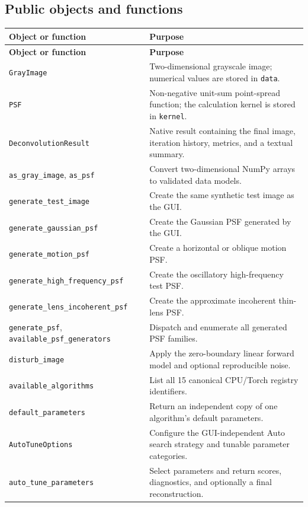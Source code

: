 \documentclass[10pt,a4paper]{article}
\newcommand{\code}[1]{\texttt{#1}}
\begin{document}
\subsection{Public objects and functions}
\begin{longtable}{>{\raggedright\arraybackslash}p{}>{\raggedright\arraybackslash}p{}}
\toprule\textbf{Object or function}&\textbf{Purpose}\\\midrule\endfirsthead
\toprule\textbf{Object or function}&\textbf{Purpose}\\\midrule\endhead
\code{GrayImage}&Two-dimensional grayscale image; numerical values are stored in \code{data}.\\
\code{PSF}&Non-negative unit-sum point-spread function; the calculation kernel is stored in \code{kernel}.\\
\code{DeconvolutionResult}&Native result containing the final image, iteration history, metrics, and a textual summary.\\
\code{as\_gray\_image}, \code{as\_psf}&Convert two-dimensional NumPy arrays to validated data models.\\
\code{generate\_test\_image}&Create the same synthetic test image as the GUI.\\
\code{generate\_gaussian\_psf}&Create the Gaussian PSF generated by the GUI.\\
\code{generate\_motion\_psf}&Create a horizontal or oblique motion PSF.\\
\code{generate\_high\_frequency\_psf}&Create the oscillatory high-frequency test PSF.\\
\code{generate\_lens\_incoherent\_psf}&Create the approximate incoherent thin-lens PSF.\\
\code{generate\_psf}, \code{available\_psf\_generators}&Dispatch and enumerate all generated PSF families.\\
\code{disturb\_image}&Apply the zero-boundary linear forward model and optional reproducible noise.\\
\code{available\_algorithms}&List all 15 canonical CPU/Torch registry identifiers.\\
\code{default\_parameters}&Return an independent copy of one algorithm's default parameters.\\
\code{AutoTuneOptions}&Configure the GUI-independent Auto search strategy and tunable parameter categories.\\
\code{auto\_tune\_parameters}&Select parameters and return scores, diagnostics, and optionally a final reconstruction.\\

\end{longtable}
\end{document}
